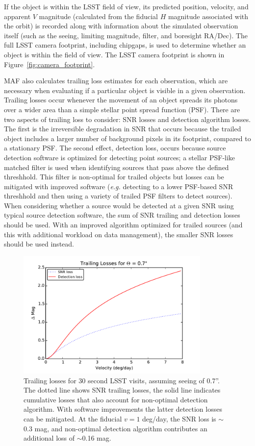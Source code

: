 If the object is within the LSST field of view, its predicted position, velocity, and apparent $V$ magnitude (calculated from the fiducial $H$ magnitude associated with the orbit) is recorded along with information about the simulated observation itself (such as the seeing, limiting magnitude, filter, and boresight RA/Dec). The full LSST camera footprint, including chipgaps, is used to determine whether
an object is within the field of view. The LSST camera footprint is shown in Figure~\ref{fig:camera_footprint}.

MAF also calculates trailing loss estimates for each observation, which are necessary when evaluating if a particular object is visible in a given observation. Trailing losses occur whenever the movement of an object spreads its photons over a wider area than a simple stellar point spread function (PSF). There are two aspects of trailing loss to consider: SNR losses and detection algorithm losses. The first is the
irreversible degradation in SNR that occurs because the trailed object includes a larger number of background pixels in its footprint, compared to a stationary PSF. The second effect, detection loss, occurs because source detection software is optimized for detecting point sources; a stellar PSF-like matched filter is used when identifying sources that pass above the defined threshhold. This filter is non-optimal for trailed objects but losses can be mitigated with improved software ({\it e.g.} detecting to a lower PSF-based SNR threshhold and then using a variety of trailed PSF filters to detect sources). When considering whether a source would be detected at a given SNR using typical source detection software, the sum of SNR trailing and detection losses should be used. With an improved
algorithm optimized for trailed sources (and this with additional workload on data management), the smaller SNR losses should be
used instead.

\begin{figure}[t!]
\centering
\includegraphics[width=0.85\textwidth]{figures/trailing_losses}
\caption{Trailing losses for 30 second LSST visits, assuming seeing of
  0.7''. The dotted line shows SNR trailing losses, the solid line
  indicates cumulative losses that also account for non-optimal detection
  algorithm. With software improvements the latter detection losses can be
  mitigated. At the fiducial $v=1$ deg/day, the SNR loss is $\sim$0.3 mag,
  and non-optimal detection algorithm contributes an additional loss of
  $\sim$0.16 mag.
\label{fig:trailinglosses}}
\end{figure}

